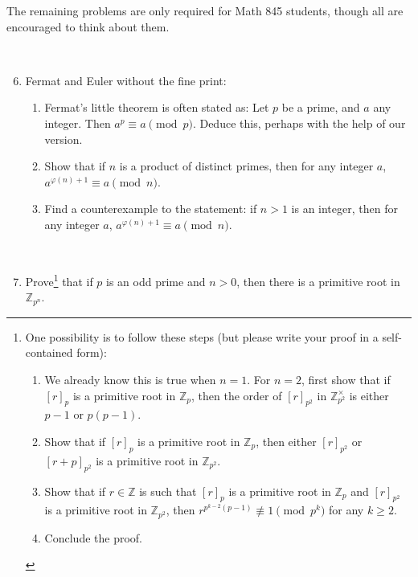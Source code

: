 \documentclass{amsart}
\def\Z{\mathbb Z}
\begin{document}
\noindent  \hrulefill

\noindent The remaining problems are only required for Math 845 students, though all are encouraged to think about them.

\

\begin{enumerate}\setcounter{enumi}{5}


\item Fermat and Euler without the fine print:
\begin{enumerate}
\item Fermat's little theorem is often stated as: Let $p$ be a prime, and $a$ any integer. Then $a^p \equiv a \pmod{p}$. Deduce this, perhaps with the help of our version.
\item Show that if $n$ is a product of distinct primes, then for any integer $a$, ${a^{\varphi(n)+1} \equiv a \pmod{n}}$.
\item Find a counterexample to the statement: if $n>1$ is an integer, then for any integer $a$, $a^{\varphi(n)+1} \equiv a \pmod{n}$.
\end{enumerate}


\

\item Prove\footnote{One possibility is to follow these steps (but please write your proof in a self-contained form):
\begin{enumerate}
\item We already know this is true when $n=1$. For $n=2$, first show that if $[r]_p$ is a primitive root in $\Z_p$, then the order of $[r]_{p^2}$ in $\Z_{p^2}^\times$ is either $p-1$ or $p(p-1)$.
\item Show that if  $[r]_p$ is a primitive root in $\Z_p$, then either $[r]_{p^2}$ or $[r+p]_{p^2}$ is a primitive root in $\Z_{p^2}$.
\item Show that if $r\in \Z$ is such that  $[r]_{p}$ is a primitive root in $\Z_{p}$ and $[r]_{p^2}$ is a primitive root in $\Z_{p^2}$, then $r^{p^{k-2}(p-1)} \not\equiv 1 \pmod{p^k}$ for any $k\geq 2$.
\item Conclude the proof.
\end{enumerate}}
 that if $p$ is an odd prime and $n>0$, then there is a primitive root in $\Z_{p^n}$.




\end{enumerate}
\end{document}
